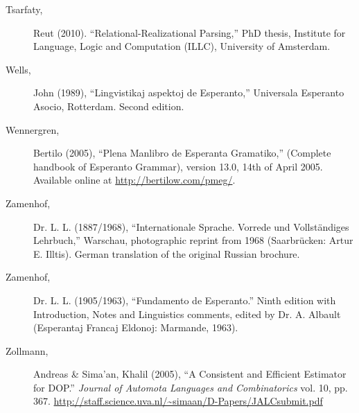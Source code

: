 \documentclass[10pt,a4paper]{article}
\begin{document}
\begin{description}
\item[Tsarfaty,] Reut (2010). ``Relational-Realizational Parsing,'' PhD thesis,
Institute for Language, Logic and Computation (ILLC), University of Amsterdam.

\item[Wells,] John (1989), ``Lingvistikaj aspektoj de Esperanto,'' Universala
Esperanto Asocio, Rotterdam. Second edition.

\item[Wennergren,] Bertilo (2005), ``Plena Manlibro de Esperanta Gramatiko,''
(Complete handbook of Esperanto Grammar), version 13.0, 14th of April 2005.
Available online at \url{http://bertilow.com/pmeg/}.

\item[Zamenhof,] Dr. L. L. (1887/1968), ``Internationale Sprache. Vorrede und
Vollst\"andiges Lehrbuch,'' Warschau, photographic reprint from 1968
(Saarbr\"ucken: Artur E. Illtis). German translation of the original Russian
brochure.

\item[Zamenhof,] Dr. L. L. (1905/1963), ``Fundamento de Esperanto.'' Ninth
edition with Introduction, Notes and Linguistics comments, edited by Dr. A.
Albault (Esperantaj Francaj Eldonoj: Marmande, 1963).

\item[Zollmann,] Andreas \& Sima'an, Khalil (2005), ``A Consistent and Efficient
Estimator for DOP.''  {\em Journal of Automota Languages and Combinatorics} vol.
10, pp. 367.  \url{http://staff.science.uva.nl/~simaan/D-Papers/JALCsubmit.pdf}

\end{description}
\end{document}
